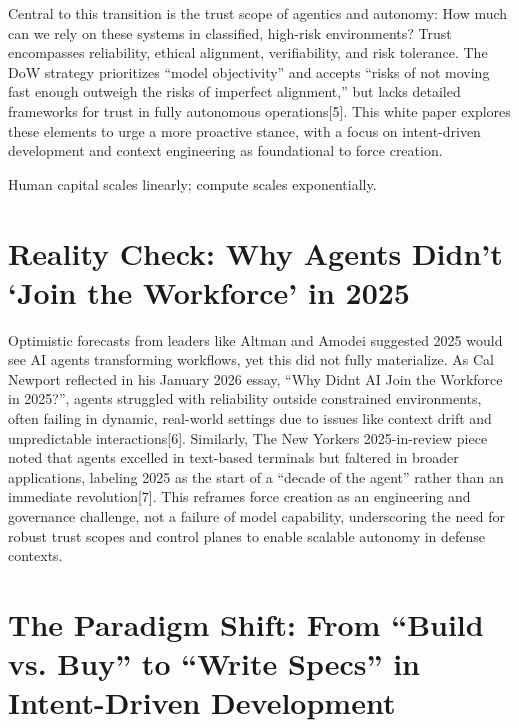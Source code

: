 \documentclass[11pt]{article}
\begin{document}
Central to this transition is the trust scope of agentics and autonomy: How much can we rely on these systems in classified, high-risk environments? Trust encompasses reliability, ethical alignment, verifiability, and risk tolerance. The DoW strategy prioritizes ``model objectivity'' and accepts ``risks of not moving fast enough outweigh the risks of imperfect alignment,'' but lacks detailed frameworks for trust in fully autonomous operations[5]. This white paper explores these elements to urge a more proactive stance, with a focus on intent-driven development and context engineering as foundational to force creation.

\begin{calloutquote}
Human capital scales linearly; compute scales exponentially.
\end{calloutquote}

\section{Reality Check: Why Agents Didn't `Join the Workforce' in 2025}\label{reality-check-why-agents-didnt-join-the-workforce-in-2025}

Optimistic forecasts from leaders like Altman and Amodei suggested 2025 would see AI agents transforming workflows, yet this did not fully materialize. As Cal Newport reflected in his January 2026 essay, ``Why Didn\textquotesingle t AI \textquotesingle Join the Workforce\textquotesingle{} in 2025?'', agents struggled with reliability outside constrained environments, often failing in dynamic, real-world settings due to issues like context drift and unpredictable interactions[6]. Similarly, The New Yorker\textquotesingle s 2025-in-review piece noted that agents excelled in text-based terminals but faltered in broader applications, labeling 2025 as the start of a ``decade of the agent'' rather than an immediate revolution[7]. This reframes force creation as an engineering and governance challenge, not a failure of model capability, underscoring the need for robust trust scopes and control planes to enable scalable autonomy in defense contexts.

\section{The Paradigm Shift: From ``Build vs. Buy'' to ``Write Specs'' in Intent-Driven Development}\label{the-paradigm-shift-from-build-vs-buy-to-write-specs-in-intent-driven-development}
\end{document}

